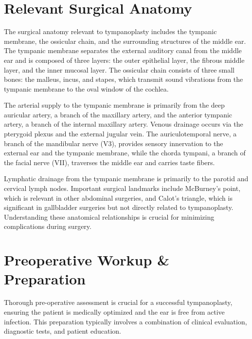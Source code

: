 \section*{Relevant Surgical Anatomy}
The surgical anatomy relevant to tympanoplasty includes the tympanic membrane, the ossicular chain, and the surrounding structures of the middle ear. The tympanic membrane separates the external auditory canal from the middle ear and is composed of three layers: the outer epithelial layer, the fibrous middle layer, and the inner mucosal layer. The ossicular chain consists of three small bones: the malleus, incus, and stapes, which transmit sound vibrations from the tympanic membrane to the oval window of the cochlea.

The arterial supply to the tympanic membrane is primarily from the deep auricular artery, a branch of the maxillary artery, and the anterior tympanic artery, a branch of the internal maxillary artery. Venous drainage occurs via the pterygoid plexus and the external jugular vein. The auriculotemporal nerve, a branch of the mandibular nerve (V3), provides sensory innervation to the external ear and the tympanic membrane, while the chorda tympani, a branch of the facial nerve (VII), traverses the middle ear and carries taste fibers.

Lymphatic drainage from the tympanic membrane is primarily to the parotid and cervical lymph nodes. Important surgical landmarks include McBurney's point, which is relevant in other abdominal surgeries, and Calot's triangle, which is significant in gallbladder surgeries but not directly related to tympanoplasty. Understanding these anatomical relationships is crucial for minimizing complications during surgery.

\section*{Preoperative Workup \& Preparation}
Thorough pre-operative assessment is crucial for a successful tympanoplasty, ensuring the patient is medically optimized and the ear is free from active infection. This preparation typically involves a combination of clinical evaluation, diagnostic tests, and patient education.

